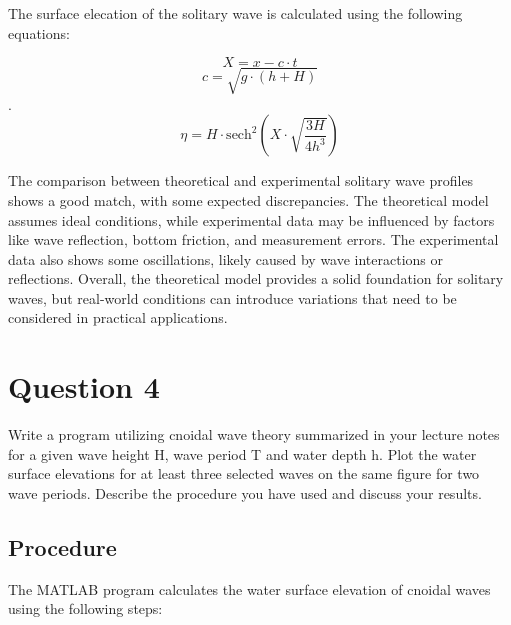 \documentclass[a4paper]{article}
\begin{document}
The surface elecation of the solitary wave is calculated using the following equations:

\[X = x - c \cdot t\] 
\[c = \sqrt{g \cdot (h+H)}\]. 
\[\eta = H \cdot \text{sech}^2\left(X \cdot \sqrt{\frac{3H}{4h^3}}\right)\]

The comparison between theoretical and experimental solitary wave profiles shows a good match, with some expected discrepancies. The theoretical model assumes ideal conditions, while experimental data may be influenced by factors like wave reflection, bottom friction, and measurement errors. The experimental data also shows some oscillations, likely caused by wave interactions or reflections. Overall, the theoretical model provides a solid foundation for solitary waves, but real-world conditions can introduce variations that need to be considered in practical applications.

\section{Question 4} Write a program utilizing cnoidal wave theory summarized in your lecture notes for a given wave height H, wave period T and water depth h. Plot the water surface elevations for at least three selected waves on the same figure for two wave periods. Describe the procedure you have used and discuss your results.

\subsection*{Procedure}
The MATLAB program calculates the water surface elevation of cnoidal waves using the following steps:
\end{document}
